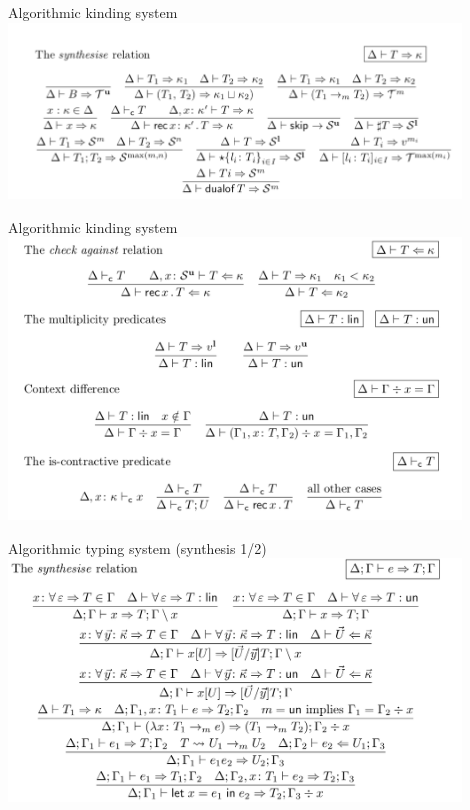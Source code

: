 \documentclass[10pt]{beamer}
\begin{document}
{
\begin{frame}{Algorithmic kinding system}
	\hspace*{-8mm}\includegraphics[width=12cm]{img/synthesise}
\end{frame}

\begin{frame}{Algorithmic kinding system}
	\hspace*{-8mm}\includegraphics[width=12cm]{img/kinding}	
\end{frame}

\begin{frame}{Algorithmic typing system (synthesis 1/2)}
	\hspace*{-8mm}\includegraphics[width=12cm]{img/type-synth1}	
\end{frame}

}
\end{document}
